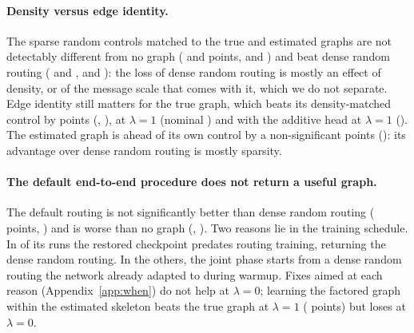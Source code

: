 \documentclass[anon,12pt]{clear2027} %
\begin{document}
\paragraph{Density versus edge identity.}
The sparse random controls matched to the true and estimated graphs are not detectably different from no graph (\SynHighRandTrueNone{} and \SynHighRandEstNone{} points, \SynHighRandTrueNonePe{} and \SynHighRandEstNonePe{}) and beat dense random routing (\SynHighRandTrueRandom{} and \SynHighRandEstRandom{}, \SynHighRandTrueRandomPe{} and \SynHighRandEstRandomPe{}): the loss of dense random routing is mostly an effect of density, or of the message scale that comes with it, which we do not separate. Edge identity still matters for the true graph, which beats its density-matched control by \SynHighTrueRandTrueAbs{} points (\SynHighTrueRandTrueWL{}, \SynHighTrueRandTruePe{}), \SynHighTrueRandTrueLamOneAbs{} at $\lambda=1$ (nominal \SynHighTrueRandTrueLamOnePe{}) and \SynHighAddTrueRandTrueLamOneAbs{} with the additive head at $\lambda=1$ (\SynHighAddTrueRandTrueLamOnePe{}). The estimated graph is ahead of its own control by a non-significant \SynHighEstRandEstAbs{} points (\SynHighEstRandEstPe{}): its advantage over dense random routing is mostly sparsity.

\paragraph{The default end-to-end procedure does not return a useful graph.}
The default routing is not significantly better than dense random routing (\SynHighLearnRand{} points, \SynHighLearnRandPe{}) and is worse than no graph (\SynHighLearnNone{}, \SynHighLearnNonePe{}). Two reasons lie in the training schedule. In \SynHighWarmupRestore{} of its \SynHighLearnedRuns{} runs the restored checkpoint predates routing training, returning the dense random routing. In the others, the joint phase starts from a dense random routing the network already adapted to during warmup. Fixes aimed at each reason (Appendix~\ref{app:when}) do not help at $\lambda=0$; learning the factored graph within the estimated skeleton beats the true graph at $\lambda=1$ (\SynHighSkelEstTrueLamOne{} points) but loses \SynHighSkelEstTrueLamZeroAbs{} at $\lambda=0$.
\end{document}

